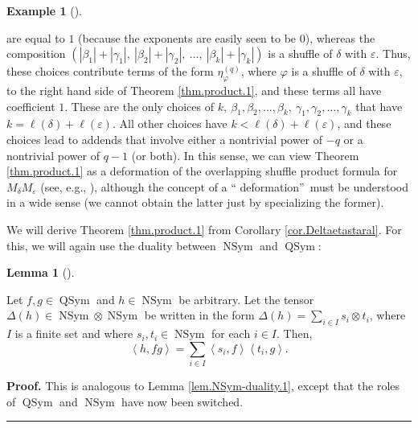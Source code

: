 \documentclass[numbers=enddot,12pt,final,onecolumn,notitlepage]{scrartcl}%
\theoremstyle{definition}
\newtheorem{lem}[theo]{Lemma}
\newenvironment{lemma}[1][]
{\begin{lem}[#1]\begin{leftbar}}
{\end{leftbar}\end{lem}}
\newtheorem{exam}[theo]{Example}
\newenvironment{example}[1][]
{\begin{exam}[#1]\begin{leftbar}}
{\end{leftbar}\end{exam}}
\newenvironment{proof}[1][Proof]{\noindent\textbf{#1.} }{\ \rule{0.5em}{0.5em}}
\let\sumnonlimits\sum
\renewcommand{\sum}{\sumnonlimits\limits}
\begin{document}
\begin{example}
\[\]
are equal to $1$ (because the exponents are easily seen to be $0$), whereas
the composition $\left(  \left\vert \beta_{1}\right\vert +\left\vert
\gamma_{1}\right\vert ,\ \left\vert \beta_{2}\right\vert +\left\vert
\gamma_{2}\right\vert ,\ \ldots,\ \left\vert \beta_{k}\right\vert +\left\vert
\gamma_{k}\right\vert \right)  $ is a shuffle of $\delta$ with $\varepsilon$.
Thus, these choices contribute terms of the form $\eta_{\varphi}^{\left(
q\right)  }$, where $\varphi$ is a shuffle of $\delta$ with $\varepsilon$, to
the right hand side of Theorem \ref{thm.product.1}, and these terms all have
coefficient $1$. These are the only choices of $k,\ \beta_{1},\beta_{2}%
,\ldots,\beta_{k},\ \gamma_{1},\gamma_{2},\ldots,\gamma_{k}$ that have
$k=\ell\left(  \delta\right)  +\ell\left(  \varepsilon\right)  $. All other
choices have $k<\ell\left(  \delta\right)  +\ell\left(  \varepsilon\right)  $,
and these choices lead to addends that involve either a nontrivial power of
$-q$ or a nontrivial power of $q-1$ (or both). In this sense, we can view
Theorem \ref{thm.product.1} as a deformation of the overlapping shuffle
product formula for $M_{\delta}M_{\varepsilon}$ (see, e.g., \cite[Proposition
5.1.3]{GriRei}), although the concept of a \textquotedblleft
deformation\textquotedblright\ must be understood in a wide sense (we cannot
obtain the latter just by specializing the former).
\end{example}

We will derive Theorem \ref{thm.product.1} from Corollary
\ref{cor.Deltaetastaral}. For this, we will again use the duality between
$\operatorname*{NSym}$ and $\operatorname*{QSym}$:

\begin{lemma}
\label{lem.NSym-duality.2}Let $f,g\in\operatorname*{QSym}$ and $h\in
\operatorname*{NSym}$ be arbitrary. Let the tensor $\Delta\left(  h\right)
\in\operatorname*{NSym}\otimes\operatorname*{NSym}$ be written in the form
$\Delta\left(  h\right)  =\sum_{i\in I}s_{i}\otimes t_{i}$, where $I$ is a
finite set and where $s_{i},t_{i}\in\operatorname*{NSym}$ for each $i\in I$.
Then,%
\[
\left\langle h,fg\right\rangle =\sum_{i\in I}\left\langle s_{i},f\right\rangle
\left\langle t_{i},g\right\rangle .
\]

\end{lemma}

\begin{proof}
This is analogous to Lemma \ref{lem.NSym-duality.1}, except that the roles of
$\operatorname*{QSym}$ and $\operatorname*{NSym}$ have now been switched.
\end{proof}
\end{document}
